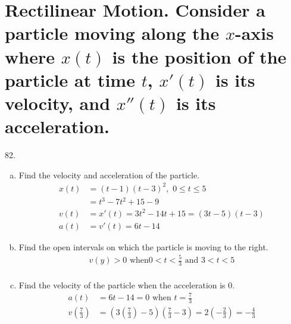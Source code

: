 \documentclass[11pt]{article}
\begin{document}
\section{Rectilinear Motion. Consider a particle
moving along the $x$-axis where $x(t)$ is the position of the particle
at time $t$, $x'(t)$ is its velocity, and $x''(t)$  is its acceleration.}

82.\begin{enumerate}[(a)]
    \item Find the velocity and acceleration of the particle.
        \begin{align}
            x(t)&=(t-1)(t-3)^2,\,\, 0\leq t\leq 5\\
            &=t^3-7t^2+15-9\\
            v(t)&=x'(t)=3t^2-14t+15=(3t-5)(t-3)\\
            a(t)&=v'(t)=6t-14
        \end{align}
    \item Find the open intervals on which the particle is moving to
    the right.
        \begin{align}
            v(y)>0\,\,\text{when}0<t<\frac{5}{3}\,\,\text{and}\,\, 3<t<5\\
        \end{align}
    \item Find the velocity of the particle when the acceleration is 0.
        \begin{align}
            a(t)&=6t-14=0\,\,\text{when}\,\, t=\frac{7}{3}\\
            v(\frac{7}{3})&=\left(3\left(\frac{7}{3}\right)-5\right)\left(\frac{7}{3}-3\right)=2\left(-\frac{2}{3}\right)=-\frac{4}{3}
        \end{align}
\end{enumerate}
\end{document}
